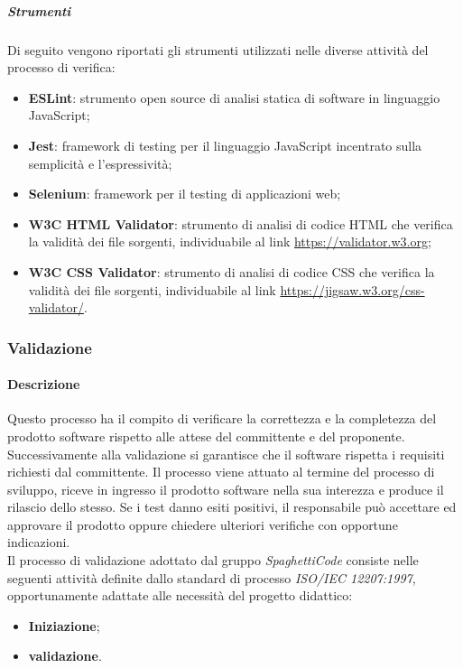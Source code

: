\subparagraph{Strumenti}
\label{ssub:verifica:strumenti}

Di seguito vengono riportati gli strumenti utilizzati nelle diverse attività del processo di verifica:
\begin{itemize}
	\item \textbf{ESLint}: strumento open source di analisi statica di software in linguaggio JavaScript;
	\item \textbf{Jest}: framework di testing per il linguaggio JavaScript incentrato sulla semplicità e l'espressività;
	\item \textbf{Selenium}: framework per il testing di applicazioni web;
	\item \textbf{W3C HTML Validator}: strumento di analisi di codice HTML che verifica la validità dei file sorgenti, individuabile al
		link \url{https://validator.w3.org};
	\item \textbf{W3C CSS Validator}: strumento di analisi di codice CSS che verifica la validità dei file sorgenti, individuabile al
		link \url{https://jigsaw.w3.org/css-validator/}.
\end{itemize}

\subsubsection{Validazione}
\label{sub:validazione}

\paragraph{Descrizione}
\label{par:descrizione}

Questo processo ha il compito di verificare la correttezza e la completezza del prodotto software rispetto alle attese del committente e
del proponente. Successivamente alla validazione si garantisce che il software rispetta i requisiti richiesti dal committente.
Il processo viene attuato al termine del processo di sviluppo, riceve in ingresso il prodotto software nella sua interezza
e produce il rilascio dello stesso. Se i test danno esiti positivi, il responsabile può accettare ed approvare il prodotto oppure chiedere ulteriori verifiche con opportune indicazioni.\\

Il processo di validazione adottato dal gruppo \emph{SpaghettiCode} consiste nelle seguenti attività definite dallo standard di processo \emph{ISO/IEC 12207:1997}, opportunamente adattate alle necessità del progetto didattico:
\begin{itemize}
	\item \textbf{Iniziazione};
	\item \textbf{validazione}.
\end{itemize}

